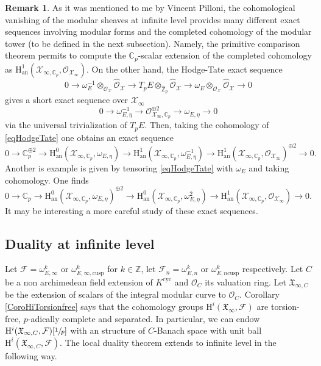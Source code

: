 \documentclass[JEP,XML,SOM,Unicode,published]{cedram}
\let\ra\rightarrow
\newcommand{\an}{\mathrm{an}}
\newcommand{\cusp}{\mathrm{cusp}}
\newcommand{\cyc}{\mathrm{cyc}}
\numberwithin{equation}{section}
\theoremstyle{definition}
\newtheorem{remark}[prop]{Remark}
\newcommand{\bb}[1]{\mathbb{#1}}
\newcommand{\n}[1]{\mathcal{#1}}
\newcommand{\f}[1]{\mathfrak{#1}}
\newcommand{\s}[1]{\mathscr{#1}}
\begin{document}
\begin{remark}
As it was mentioned to me by Vincent Pilloni, the cohomological vanishing of the modular sheaves at infinite level provides many different exact sequences involving modular forms and the completed cohomology of the modular tower (to be defined in the next subsection). Namely, the primitive comparison theorem permits to compute the $\bb{C}_p$-scalar extension of the completed cohomology as $\mathrm{H}_{\an}^1(\n{X}_{\infty,\bb{C}_p}, \s{O}_{\n{X}_\infty})$. On the other hand, the Hodge-Tate exact sequence
\[
0\to \omega_E^{-1} \otimes_{\s{O}_{\n{X}}} \widehat{\s{O}}_{\n{X}} \to T_pE \otimes_{\widehat{\bb{Z}}_p} \widehat{\s{O}}_{\n{X}} \to \omega_E\otimes_{\s{O}_{\n{X}}}\widehat{\s{O}}_{\n{X}} \to 0
\]
gives a short exact sequence over $\n{X}_{\infty}$
\begin{equation}
\label{eqHodgeTate}
0\to \omega^{-1}_{E,\eta } \to \s{O}_{\n{X}_\infty,\bb{C}_p}^{\oplus 2} \to \omega_{E,\eta} \to 0
\end{equation}
via the universal trivialization of $T_pE$. Then, taking the cohomology of \eqref{eqHodgeTate} one obtains an exact sequence
\[
0\ra \bb{C}_p^{\oplus 2}\ra \mathrm{H}_{\an}^0(\n{X}_{\infty,\bb{C}_p}, \omega_{E,\eta}) \to \mathrm{H}_{\an}^1(\n{X}_{\infty,\bb{C}_p}, \omega_{E,\eta}^{-1}) \to \mathrm{H}_{\an}^1(\n{X}_{\infty,\bb{C}_p} , \s{O}_{\n{X}_{\infty}})^{\oplus 2}\ra 0.
\]
Another is example is given by tensoring \eqref{eqHodgeTate} with $\omega_{E}$ and taking cohomology. One finds
\[
0\ra \bb{C}_p \ra \mathrm{H}_{\an}^0(\n{X}_{\infty,\bb{C}_p}, \omega_{E,\eta})^{\oplus 2} \to \mathrm{H}_{\an}^0(\n{X}_{\infty,\bb{C}_p}, \omega_{E,\eta}^{2}) \to \mathrm{H}_{\an}^1(\n{X}_{\infty,\bb{C}_p} , \s{O}_{\n{X}_{\infty}}) \ra 0.
\]
It may be interesting a more careful study of these exact sequences.
\end{remark}

\subsection*{Duality at infinite level}

Let $\n{F}=\omega^k_{E,\infty}$ or $\omega^{k}_{E,\infty,\cusp}$ for $k\in \bb{Z}$, let $\n{F}_n= \omega^k_{E,n}$ or $\omega^k_{E,n \cusp}$ respectively. Let $C$ be a non archimedean field extension of $K^{\cyc}$ and $\n{O}_C$ its valuation ring. Let $\f{X}_{\infty,C}$ be the extension of scalars of the integral modular curve to $\n{O}_C$. Corollary \ref{CoroHiTorsionfree} says that the cohomology groups $\mathrm{H}^i(\f{X}_{\infty}, \n{F})$ are torsion-free, $p$-adically complete and separated. In particular, we can endow $\mathrm{H}^i(\f{X}_{\infty, C}, \n{F})[\sfrac{1}{p}]$ with an structure of $C$-Banach space with unit ball $\mathrm{H}^i(\f{X}_{\infty,C}, \n{F})$. The local duality theorem extends to infinite level in the following way.
\end{document}
